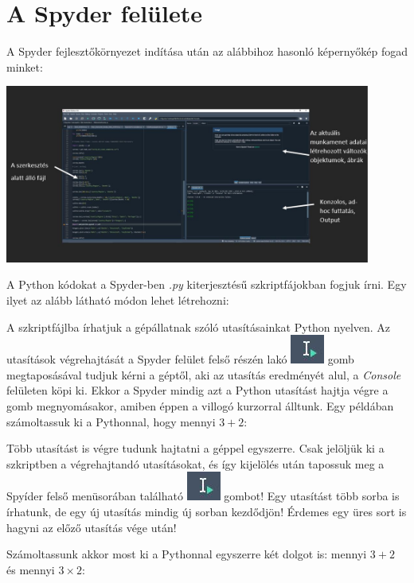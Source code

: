 \documentclass[
]{book}
\begin{document}
\section{A Spyder felülete}\label{a-spyder-feluxfclete}

A Spyder fejlesztőkörnyezet indítása után az alábbihoz hasonló képernyőkép fogad minket:

\includegraphics[width=0.9\textwidth,height=\textheight]{Spyder.jpg}

A Python kódokat a Spyder-ben \emph{.py} kiterjesztésű szkriptfájokban fogjuk írni.
Egy ilyet az alább látható módon lehet létrehozni:

A szkriptfájlba írhatjuk a gépállatnak szóló utasításainkat Python nyelven. Az utasítások végrehajtását a Spyder felület felső részén lakó \includegraphics{RunLine.jpg} gomb megtaposásával tudjuk kérni a géptől, aki az utasítás eredményét alul, a \emph{Console} felületen köpi ki. Ekkor a Spyder mindig azt a Python utasítást hajtja végre a gomb megnyomásakor, amiben éppen a villogó kurzorral álltunk.
Egy példában számoltassuk ki a Pythonnal, hogy mennyi \(3+2\):

Több utasítást is végre tudunk hajtatni a géppel egyszerre. Csak jelöljük ki a szkriptben a végrehajtandó utasításokat, és így kijelölés után tapossuk meg a Spyíder felső menüsorában található \includegraphics{RunLine.jpg} gombot!
Egy utasítást több sorba is írhatunk, de egy új utasítás mindig új sorban kezdődjön! Érdemes egy üres sort is hagyni az előző utasítás vége után!

Számoltassunk akkor most ki a Pythonnal egyszerre két dolgot is: mennyi \(3+2\) és mennyi \(3 \times 2\):
\end{document}

